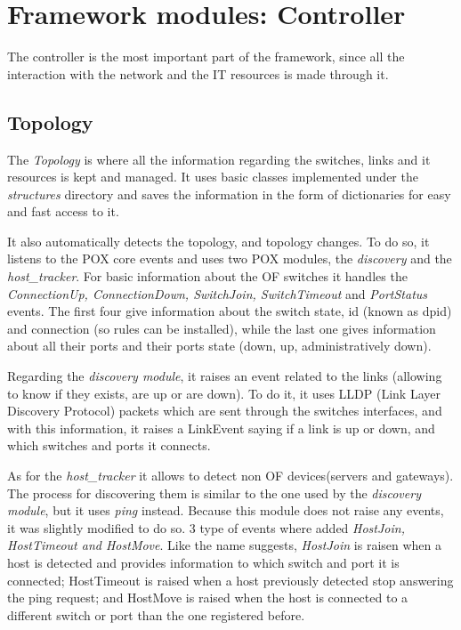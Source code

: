\documentclass[12pt,english,oneside]{book}
\begin{document}
\newpage

\section{Framework modules: Controller}
\hspace{0.6cm}

The controller is the most important part of the framework, since all the interaction with the network and the IT resources is made through it.

\subsection{Topology}
\hspace{0.6cm}

The \textit{Topology} is where all the information regarding the switches, links and it resources is kept and managed. It uses basic classes implemented under the \textit{structures} directory and saves the information in the form of dictionaries for easy and fast access to it.

It also automatically detects the topology, and topology changes. To do so, it listens to the POX core events and uses two POX modules, the \textit{discovery} and the \textit{host\_tracker}.
For basic information about the OF switches it handles the \textit{ConnectionUp, ConnectionDown, SwitchJoin, SwitchTimeout} and \textit{PortStatus} events.
The first four give information about the switch state, id (known as dpid) and connection (so rules can be installed), while the last one gives information about all their ports and their ports state (down, up, administratively down).

Regarding the \textit{discovery module}, it raises an event related to the links (allowing to know if they exists, are up or are down). To do it, it uses LLDP (Link Layer Discovery Protocol) packets which are sent through the switches interfaces, and with this information, it raises a LinkEvent saying if a link is up or down, and which switches and ports it connects.

As for the \textit{host\_tracker} it allows to detect non OF devices(servers and gateways). The process for discovering them is similar to the one used by the \textit{discovery module}, but it uses \textit{ping} instead.
Because this module does not raise any events, it was slightly modified to do so.
$3$ type of events where added \textit{HostJoin, HostTimeout and HostMove}. Like the name suggests, \textit{HostJoin} is raisen when a host is detected and provides information to which switch and port it is connected; HostTimeout is raised when a host previously detected stop answering the ping request; and HostMove is raised when the host is connected to a different switch or port than the one registered before.
\end{document}
